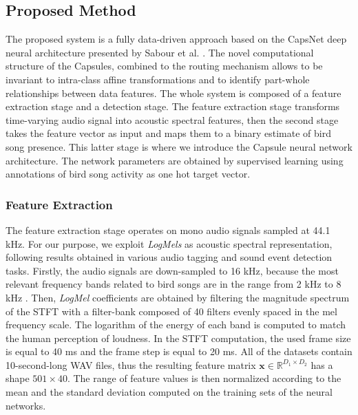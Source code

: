 \subsection{Proposed Method}
The proposed system is a fully data-driven approach based on the CapsNet deep neural architecture presented by Sabour et al. \cite{sabour2017dynamic}.
The novel computational structure of the Capsules, combined to the routing mechanism allows to be invariant to intra-class affine transformations and to identify part-whole relationships between data features.
The whole system is composed of a feature extraction stage and a detection stage. The feature extraction stage transforms time-varying audio signal into acoustic spectral features, then the second stage takes the feature vector as input and maps them to a binary estimate of bird song presence.
This latter stage is where we introduce the Capsule neural network architecture.
The network parameters are obtained by supervised learning using annotations of bird song activity as one hot target vector.

\subsubsection{Feature Extraction}

The feature extraction stage operates on mono audio signals sampled at 44.1 kHz. For our purpose, we exploit \textit{LogMels} as acoustic spectral representation, following results obtained in various audio tagging and sound event detection tasks. Firstly, the audio signals are down-sampled to 16 kHz, because the most relevant frequency bands related to bird songs are in the range from 2 kHz to 8 kHz \cite{payne2010handbook}. Then, \textit{LogMel} coefficients are obtained by filtering the magnitude spectrum of the STFT with a filter-bank composed of 40 filters evenly spaced in the mel frequency scale. The logarithm of the energy of each band is computed to match the human perception of loudness. In the STFT computation, the used frame size is equal to 40 ms and the frame step is equal to 20 ms. 
All of the datasets contain 10-second-long WAV files, thus the resulting feature matrix $\mathbf{x} \in \mathbb{R}^{D_1\times D_2}$ has a shape $501\times40$.
The range of feature values is then normalized according to the mean and the standard deviation computed on the training sets of the neural networks.

